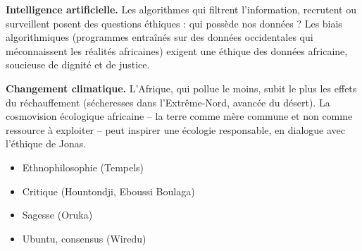 \documentclass[11pt]{article}
\newcounter{popsec}
\newcounter{popsub}
\newcommand{\courssub}[1]{%
  \stepcounter{popsub}%
  \par\vspace{9pt}\noindent{\popxbold\fontsize{11.5}{13}\selectfont\color{popink}{\color{poporange}\thepopsec.\thepopsub}\hspace{6pt}#1}\par\nopagebreak\vspace{4pt}
}
\begin{document}
\textbf{Intelligence artificielle.} Les algorithmes qui filtrent l'information, recrutent ou surveillent posent des questions éthiques : qui possède nos données ? Les biais algorithmiques (programmes entraînés sur des données occidentales qui méconnaissent les réalités africaines) exigent une éthique des données africaine, soucieuse de dignité et de justice.

\textbf{Changement climatique.} L'Afrique, qui pollue le moins, subit le plus les effets du réchauffement (sécheresses dans l'Extrême-Nord, avancée du désert). La cosmovision écologique africaine -- la terre comme mère commune et non comme ressource à exploiter -- peut inspirer une écologie responsable, en dialogue avec l'éthique de Jonas.

\courssub{Carte mentale de synthèse}

\begin{popfigure}
\begin{center}
\begin{center}\end{center}
\vspace{-2pt}
\begin{tcbraster}[raster columns=2,raster equal height=rows,raster column skip=6pt,raster row skip=6pt,enhanced,blankest]
\begin{tcolorbox}[enhanced,colback=white,colframe=popblue,boxrule=0.9pt,arc=3pt,title={Histoire et courants},fonttitle=\bfseries\scriptsize,coltitle=white,colbacktitle=popblue,left=4pt,right=4pt,top=2pt,bottom=2pt,boxsep=1pt,toptitle=1.5pt,bottomtitle=1.5pt,halign=left]
\begin{itemize}[nosep,leftmargin=*,itemsep=1pt,font=\scriptsize]
\item Ethnophilosophie (Tempels)
\item Critique (Hountondji, Eboussi Boulaga)
\item Sagesse (Oruka)
\end{itemize}
\end{tcolorbox}
\begin{tcolorbox}[enhanced,colback=white,colframe=popgreen,boxrule=0.9pt,arc=3pt,title={Vivre-ensemble},fonttitle=\bfseries\scriptsize,coltitle=white,colbacktitle=popgreen,left=4pt,right=4pt,top=2pt,bottom=2pt,boxsep=1pt,toptitle=1.5pt,bottomtitle=1.5pt,halign=left]
\begin{itemize}[nosep,leftmargin=*,itemsep=1pt,font=\scriptsize]
\item Ubuntu, consensus (Wiredu)

\end{itemize}
\end{tcolorbox}
\end{tcbraster}
\end{center}
\end{popfigure}
\end{document}
